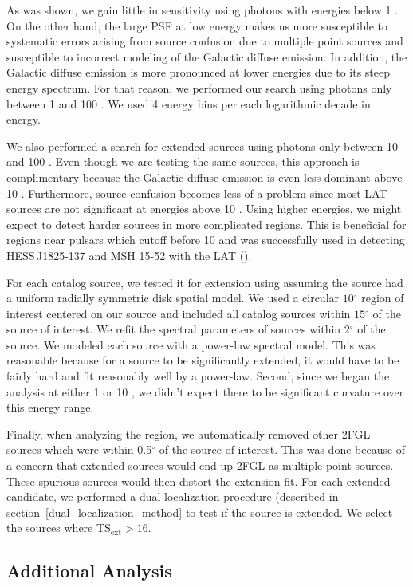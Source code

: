 \documentclass[12pt,preprint]{aastex}
\newcommand{\gev}{\text{GeV}\xspace}
\newcommand{\tsext}{{\ensuremath{\text{TS}_{\text{ext}}}}\xspace}
\renewcommand{\deg}{\ensuremath{^\circ}\xspace}
\newcommand{\pointlike}{\text{\em pointlike}\xspace}
\begin{document}
As was shown, we gain little in sensitivity using photons with energies
below 1 \gev. On the other hand, the large PSF at low energy makes us
more susceptible to systematic errors arising from source confusion due
to multiple point sources and susceptible to incorrect modeling of the
Galactic diffuse emission. In addition, the Galactic diffuse emission
is more pronounced at lower energies due to its steep energy spectrum.
For that reason, we performed our search using photons only between 1
\gev and 100 \gev.  We used 4 energy bins per each logarithmic decade
in energy.

We also performed a search for extended sources using photons only
between 10 \gev and 100 \gev. Even though we are testing the same
sources, this approach is complimentary because the Galactic diffuse
emission is even less dominant above 10 \gev. Furthermore, source
confusion becomes less of a problem since most LAT sources are not
significant at energies above 10 \gev.  Using higher energies, we might
expect to detect harder sources in more complicated regions. This is
beneficial for regions near pulsars which cutoff before 10 \gev and was
successfully used in detecting HESS\,J1825-137 and MSH 15-52 with the LAT
(\cite{msh1552,fermi_hess_j1825}).

For each catalog source, we tested it for extension using \pointlike
assuming the source had a uniform radially symmetric disk spatial model.
We used a circular $10\deg$ region of interest centered on our source and
included all catalog sources within $15\deg$ of the source of interest.
We refit the spectral parameters of sources within $2\deg$ of the source.
We modeled each source with a power-law spectral model. This was reasonable because for a source to be significantly
extended, it would have to be fairly hard and fit reasonably well by
a power-law. Second, since we began the analysis at either 1 \gev or
10 \gev, we didn't expect there to be significant curvature over this
energy range.

Finally, when analyzing the region, we automatically removed other
2FGL sources which were within 0.5\deg of the source of interest. This was done because of
a concern that extended sources would end up 2FGL as
multiple point sources. These spurious sources would then
distort the extension fit.
For each extended candidate, we performed a dual localization procedure
(described in section~\ref{dual_localization_method} to test if the
source is extended. We select the sources where $\tsext>16$.

\subsection{Additional Analysis}
\end{document}

